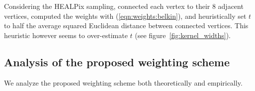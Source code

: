\documentclass{article} %
\newcommand{\figref}[1]{figure~\ref{fig:#1}}
\newcommand{\eqnref}[1]{(\ref{eqn:#1})}
\begin{document}
Considering the HEALPix sampling, \citet{perraudin2019deepspherecosmo} connected each vertex to their 8 adjacent vertices, computed the weights with \eqnref{weights:belkin}, and heuristically set $t$ to half the average squared Euclidean distance between connected vertices.
This heuristic however seems to over-estimate $t$ (see \figref{kernel_widths}).

\subsection{Analysis of the proposed weighting scheme}

We analyze the proposed weighting scheme both theoretically and empirically.
\end{document}
